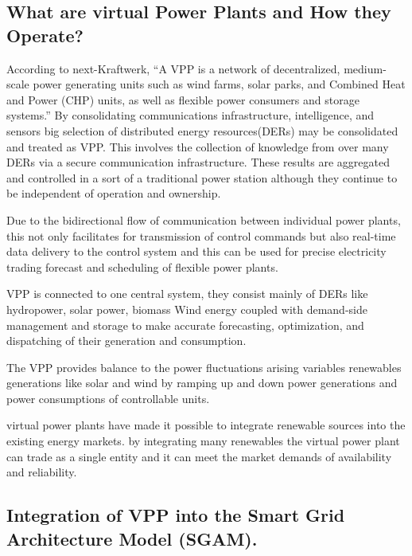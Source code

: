 \documentclass[nonacm,sigconf,12pt]{acmart}
\begin{document}
\subsection*{What are virtual Power Plants and How they Operate?}
According to next-Kraftwerk, “A VPP is a network of decentralized, medium-scale power generating units such as wind farms, solar parks, and Combined Heat and Power (CHP) units, as well as flexible power consumers and storage systems.”\cite{nextkraftwerke_2019_} By consolidating communications infrastructure, intelligence, and sensors big selection of distributed energy resources(DERs) may be consolidated and treated as VPP. This involves the collection of knowledge from over many DERs via a secure communication infrastructure. These results are aggregated and controlled in a sort of a traditional power station although they continue to be independent of operation and ownership.

Due to the bidirectional flow of communication between individual power plants, this not only facilitates for transmission of control commands but also real-time data delivery to the control system and this can be used for precise electricity trading forecast and scheduling of flexible power plants.

VPP is connected to one central system, they consist mainly of DERs like hydropower, solar power, biomass Wind energy coupled with demand-side management and storage to make accurate forecasting, optimization, and dispatching of their generation and consumption. \cite{nextkraftwerke_2017_vpp}

The VPP provides balance to the power fluctuations arising variables renewables generations like solar and wind by ramping up and down power generations and power consumptions of controllable units.

virtual power plants have made it possible to integrate renewable sources into the existing energy markets. by integrating many renewables the virtual power plant can trade as a single entity and it can meet the market demands of availability and reliability.

\subsection*{Integration of VPP into the Smart Grid Architecture Model  (SGAM).}
\end{document}
